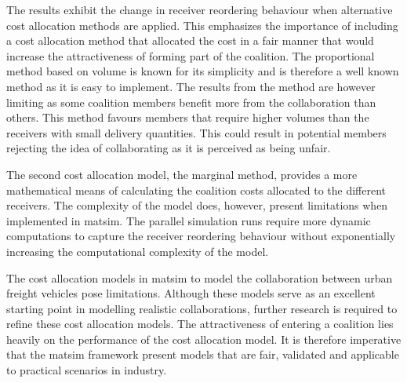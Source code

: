 The results exhibit the change in receiver reordering behaviour when alternative cost allocation methods are applied. This emphasizes the importance of including a cost allocation method that allocated the cost in a fair manner that would increase the attractiveness of forming part of the coalition. The proportional method based on volume is known for its simplicity and is therefore a well known method as it is easy to implement. The results from the method are however limiting as some coalition members benefit more from the collaboration than others. This method favours members that require higher volumes than the receivers with small delivery quantities. This could result in potential members rejecting the idea of collaborating as it is perceived as being unfair.\par

The second cost allocation model, the marginal method, provides a more mathematical means of calculating the coalition costs allocated to the different receivers. The complexity of the model does, however, present limitations when implemented in \acrshort{matsim}. The parallel simulation runs require more dynamic computations to capture the receiver reordering behaviour without exponentially increasing the computational complexity of the model. \par

The cost allocation models in \acrshort{matsim} to model the collaboration between urban freight vehicles pose limitations. Although these models serve as an excellent starting point in modelling realistic collaborations, further research is required to refine these cost allocation models. The attractiveness of entering a coalition lies heavily on the performance of the cost allocation model. It is therefore imperative that the \acrshort{matsim} framework present models that are fair, validated and applicable to practical scenarios in industry.\par 

